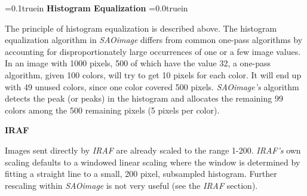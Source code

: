 \parindent=0.1truein
{\bf Histogram Equalization}
\parindent=0.0truein
\par
\vspace{0.1in}
The principle of histogram equalization is described above.  The
histogram equalization algorithm in {\em SAOimage} differs from common
one-pass algorithms by accounting for disproportionately large
occurrences of one or a few image values.  In an image with 1000 
pixels, 500 of which have the value 32, a one-pass algorithm, given
100 colors, will try to get 10 pixels for each color.  It will end up
with 49 unused colors, since one color covered 500 pixels.  {\em
SAOimage's} algorithm detects the peak (or peaks) in the histogram
and allocates the remaining 99 colors among the 500 remaining pixels
(5 pixels per color). 
\par
\vspace{0.2in}

{\bf IRAF}
\par
\vspace{0.1in}
Images sent directly by {\em IRAF} are already scaled to the range
1-200.  {\em IRAF's} own scaling defaults to a windowed linear scaling
where the window is determined by fitting a straight line to a small,
200 pixel, subsampled histogram.  Further rescaling within {\em
SAOimage} is not very useful (see the {\em IRAF} section).

